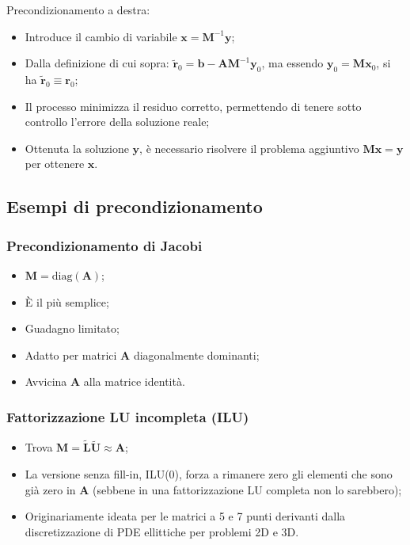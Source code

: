 Precondizionamento a destra:
\begin{itemize}
	\item Introduce il cambio di variabile $\mathbf{x} = \mathbf{M}^{-1}\mathbf{y}$;
	\item Dalla definizione di cui sopra: $\tilde{\mathbf{r}}_0 = \mathbf{b} - \mathbf{A}\mathbf{M}^{-1}\mathbf{y}_0$, ma essendo $\mathbf{y}_0 = \mathbf{M}\mathbf{x}_0$, si ha $\tilde{\mathbf{r}}_0 \equiv \mathbf{r}_0$;
	\item Il processo minimizza il residuo corretto, permettendo di tenere sotto controllo l'errore della soluzione reale;
	\item Ottenuta la soluzione $\mathbf{y}$, è necessario risolvere il problema aggiuntivo $\mathbf{M}\mathbf{x} = \mathbf{y}$ per ottenere $\mathbf{x}$.
\end{itemize}

\subsection{Esempi di precondizionamento}
\subsubsection{Precondizionamento di Jacobi}
\begin{itemize}
	\item $\mathbf{M} = \mathrm{diag}(\mathbf{A})$;
	\item È il più semplice;
	\item Guadagno limitato;
	\item Adatto per matrici $\mathbf{A}$ diagonalmente dominanti;
	\item Avvicina $\mathbf{A}$ alla matrice identità.
\end{itemize}

\subsubsection{Fattorizzazione LU incompleta (ILU)}
\begin{itemize}
	\item Trova $\mathbf{M} = \tilde{\mathbf{L}}\tilde{\mathbf{U}} \approx \mathbf{A}$;
	\item La versione senza fill-in, ILU(0), forza a rimanere zero gli elementi che sono già zero in $\mathbf{A}$ (sebbene in una fattorizzazione LU completa non lo sarebbero);
	\item Originariamente ideata per le matrici a 5 e 7 punti derivanti dalla discretizzazione di PDE ellittiche per problemi 2D e 3D.
\end{itemize}
